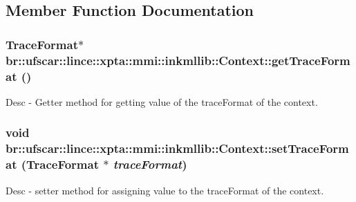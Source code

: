 \subsection{Member Function Documentation}
\hypertarget{classbr_1_1ufscar_1_1lince_1_1xpta_1_1mmi_1_1inkmllib_1_1Context_acf1377bad3c4f3eec7b6c090c5b44232}{
\subsubsection[{getTraceFormat}]{\setlength{\rightskip}{0pt plus 5cm}TraceFormat$\ast$ br::ufscar::lince::xpta::mmi::inkmllib::Context::getTraceFormat ()}}
\label{classbr_1_1ufscar_1_1lince_1_1xpta_1_1mmi_1_1inkmllib_1_1Context_acf1377bad3c4f3eec7b6c090c5b44232}


Desc -\/ Getter method for getting value of the traceFormat of the context. 

\hypertarget{classbr_1_1ufscar_1_1lince_1_1xpta_1_1mmi_1_1inkmllib_1_1Context_a573823c9b3f1220a937251f753a9d318}{
\subsubsection[{setTraceFormat}]{\setlength{\rightskip}{0pt plus 5cm}void br::ufscar::lince::xpta::mmi::inkmllib::Context::setTraceFormat (TraceFormat $\ast$ {\em traceFormat})}}
\label{classbr_1_1ufscar_1_1lince_1_1xpta_1_1mmi_1_1inkmllib_1_1Context_a573823c9b3f1220a937251f753a9d318}


Desc -\/ setter method for assigning value to the traceFormat of the context. 



